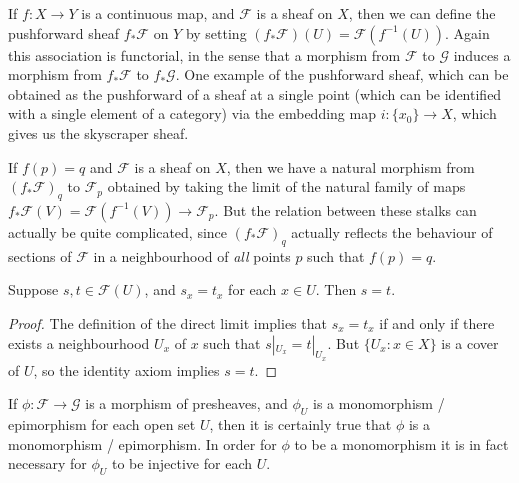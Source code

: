 \begin{example}
    If $f: X \to Y$ is a continuous map, and $\mathcal{F}$ is a sheaf on $X$, then we can define the pushforward sheaf $f_* \mathcal{F}$ on $Y$ by setting $(f_* \mathcal{F})(U) = \mathcal{F}(f^{-1}(U))$. Again this association is functorial, in the sense that a morphism from $\mathcal{F}$ to $\mathcal{G}$ induces a morphism from $f_* \mathcal{F}$ to $f_* \mathcal{G}$. One example of the pushforward sheaf, which can be obtained as the pushforward of a sheaf at a single point (which can be identified with a single element of a category) via the embedding map $i: \{ x_0 \} \to X$, which gives us the skyscraper sheaf.

    If $f(p) = q$ and $\mathcal{F}$ is a sheaf on $X$, then we have a natural morphism from $(f_* \mathcal{F})_q$ to $\mathcal{F}_p$ obtained by taking the limit of the natural family of maps $f_* \mathcal{F}(V) = \mathcal{F}(f^{-1}(V)) \to \mathcal{F}_p$. But the relation between these stalks can actually be quite complicated, since $(f_* \mathcal{F})_q$ actually reflects the behaviour of sections of $\mathcal{F}$ in a neighbourhood of \emph{all} points $p$ such that $f(p) = q$. 
\end{example}

\begin{lemma}
    Suppose $s,t \in \mathcal{F}(U)$, and $s_x = t_x$ for each $x \in U$. Then $s = t$.
\end{lemma}
\begin{proof}
    The definition of the direct limit implies that $s_x = t_x$ if and only if there exists a neighbourhood $U_x$ of $x$ such that $s|_{U_x} = t|_{U_x}$. But $\{ U_x : x \in X \}$ is a cover of $U$, so the identity axiom implies $s = t$.
\end{proof}

If $\phi: \mathcal{F} \to \mathcal{G}$ is a morphism of presheaves, and $\phi_U$ is a monomorphism / epimorphism for each open set $U$, then it is certainly true that $\phi$ is a monomorphism / epimorphism. In order for $\phi$ to be a monomorphism it is in fact necessary for $\phi_U$ to be injective for each $U$.

